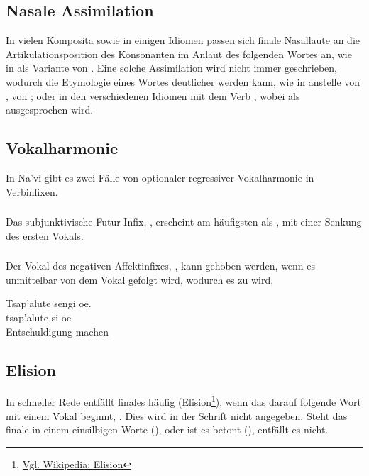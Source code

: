 \subsection{Nasale Assimilation} In vielen Komposita sowie in einigen Idiomen passen sich finale Nasallaute an die Artikulationsposition des Konsonanten im Anlaut des folgenden Wortes an, wie in  als Variante von . Eine solche Assimilation wird nicht immer geschrieben, wodurch die Etymologie eines Wortes deutlicher werden kann, wie in  anstelle von , von ; oder in den verschiedenen Idiomen mit dem Verb  , wobei  als  ausgesprochen wird.  \label{lands:nasalassim}

\subsection{Vokalharmonie} In Na'vi gibt es zwei Fälle von optionaler regressiver Vokalharmonie in Verbinfixen.

\subsubsection{} Das subjunktivische Futur-Infix, , erscheint am häufigsten als , mit einer Senkung des ersten Vokals.

\subsubsection{}\label{lands:eng}
Der Vokal des negativen Affektinfixes, , kann gehoben werden, wenn es unmittelbar von dem Vokal  gefolgt wird, wodurch es zu  wird,

\begin{interlin}
	\glll Tsap'alute sengi oe. \\
	tsap'alute si oe \\
	Entschuldigung machen  \\
\end{interlin}


\subsection{Elision} In schneller Rede entfällt finales  häufig (Elision\footnote{\href{https://de.wikipedia.org/wiki/Elision}{Vgl. Wikipedia: Elision}}), wenn das darauf folgende Wort mit einem Vokal beginnt, . Dies wird in der Schrift nicht angegeben.
Steht das finale  in einem einsilbigen Worte (), oder ist es betont (), entfällt es nicht.

